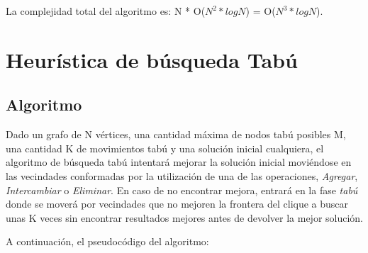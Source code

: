 \documentclass[a4paper, 10pt, twoside]{article}
\begin{document}
La complejidad total del algoritmo es: N * O($N^2 * log N$) = O($N^3 * log N$).




\newpage

\section{Heurística de búsqueda Tabú}

\subsection{Algoritmo}
Dado un grafo de N vértices, una cantidad máxima de nodos tabú posibles M, una cantidad K de movimientos tabú y una solución inicial cualquiera, el algoritmo de búsqueda tabú intentará mejorar la solución inicial moviéndose en las vecindades conformadas por la utilización de una de las operaciones, \textit{Agregar}, \textit{Intercambiar} o \textit{Eliminar}. En caso de no encontrar mejora, entrará en la fase \textit{tabú} donde se moverá por vecindades que no mejoren la frontera del clique a buscar unas K veces sin encontrar resultados mejores antes de devolver la mejor solución.

A continuación, el pseudocódigo del algoritmo:
\end{document}
